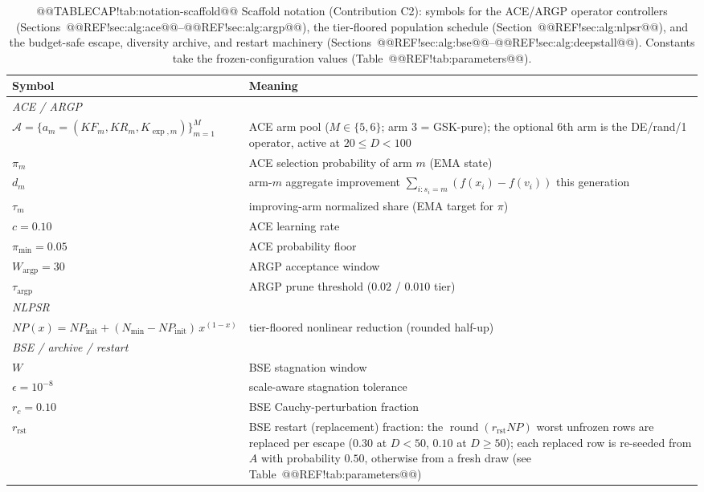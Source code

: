 \documentclass[10pt,a4paper]{article}
\begin{document}
\begin{table}[t]
\caption{@@TABLECAP!tab:notation-scaffold@@ Scaffold notation (Contribution C2): symbols for the ACE/ARGP
operator controllers (Sections~@@REF!sec:alg:ace@@--@@REF!sec:alg:argp@@), the
tier-floored population schedule (Section~@@REF!sec:alg:nlpsr@@), and the
budget-safe escape, diversity archive, and restart machinery
(Sections~@@REF!sec:alg:bse@@--@@REF!sec:alg:deepstall@@). Constants take the
frozen-configuration values (Table~@@REF!tab:parameters@@).}
\label{tab:notation-scaffold}
\footnotesize
\begin{tabular}{@{}l@{\hspace{1.2em}}p{}@{}}
\toprule
\textbf{Symbol} & \textbf{Meaning}\\
\midrule
\multicolumn{2}{l}{\emph{ACE / ARGP}}\\
\midrule
$\mathcal{A}=\{a_m=(KF_m,KR_m,K_{\exp,m})\}_{m=1}^{M}$ &
  ACE arm pool ($M\in\{5,6\}$; arm 3 = GSK-pure); the optional 6th arm is the DE/rand/1 operator, active at $20{\le}D{<}100$\\
$\pi_m$ & ACE selection probability of arm $m$ (EMA state)\\
$d_m$ & arm-$m$ aggregate improvement $\sum_{i:s_i=m}(f(x_i){-}f(v_i))$ this generation\\
$\tau_m$ & improving-arm normalized share (EMA target for $\pi$)\\
$c=0.10$ & ACE learning rate\\
$\pi_{\min}=0.05$ & ACE probability floor\\
$W_{\text{argp}}=30$ & ARGP acceptance window\\
$\tau_{\text{argp}}$ & ARGP prune threshold ($0.02$ / $0.010$ tier)\\
\midrule
\multicolumn{2}{l}{\emph{NLPSR}}\\
\midrule
$NP(x)=NP_{\text{init}}+(N_{\min}-NP_{\text{init}})\,x^{(1-x)}$ &
  tier-floored nonlinear reduction (rounded half-up)\\
\midrule
\multicolumn{2}{l}{\emph{BSE / archive / restart}}\\
\midrule
$W$ & BSE stagnation window\\
$\epsilon=10^{-8}$ & scale-aware stagnation tolerance\\
$r_{c}=0.10$ & BSE Cauchy-perturbation fraction\\
$r_{\text{rst}}$ & BSE restart (replacement) fraction: the $\operatorname{round}(r_{\text{rst}}NP)$ worst unfrozen rows are replaced per escape ($0.30$ at $D{<}50$, $0.10$ at $D{\ge}50$); each replaced row is re-seeded from $A$ with probability $0.50$, otherwise from a fresh draw (see Table~@@REF!tab:parameters@@)\\

\end{tabular}
\end{table}
\end{document}
